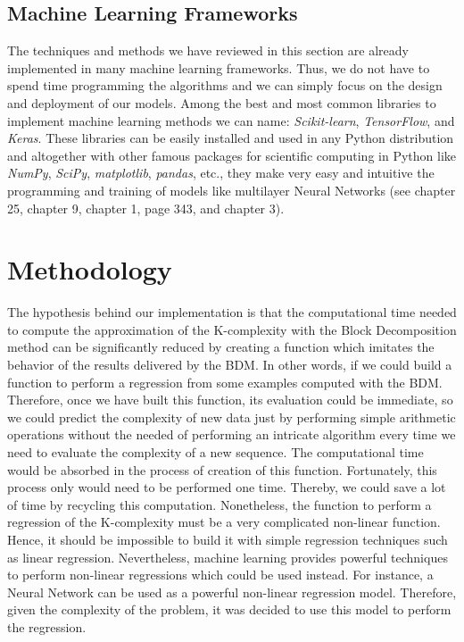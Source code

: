 \subsection{Machine Learning Frameworks}
The techniques and methods we have reviewed in this section are already implemented in many machine learning frameworks. Thus, we do not have to spend time programming the algorithms and we can simply focus on the design and deployment of our models. Among the best and most common libraries to implement machine learning methods we can name: \textit{Scikit-learn}, \textit{TensorFlow}, and \textit{Keras}. These libraries can be easily installed and used in any Python distribution and altogether with other famous packages for scientific computing in Python like \textit{NumPy}, \textit{SciPy}, \textit{matplotlib}, \textit{pandas}, etc., they make very easy and intuitive the programming and training of models like multilayer Neural Networks (see \cite{data_sience} chapter 25, \cite{machine_hands_on} chapter 9, \cite{machine_python} chapter 1, \cite{Python_datsci_Handbook} page 343, and \cite{fudamentals_deep_learning} chapter 3).

\section{Methodology}
The hypothesis behind our implementation is that the computational time needed to compute the approximation of the K-complexity with the Block Decomposition method can be significantly reduced by creating a function which imitates the behavior of the results delivered by the BDM. In other words, if we could build a function to perform a regression from some examples computed with the BDM. Therefore, once we have built this function, its evaluation could be immediate, so we could predict the complexity of new data just by performing simple arithmetic operations without the needed of performing an intricate algorithm every time we need to evaluate the complexity of a new sequence. The computational time would be absorbed in the process of creation of this function. Fortunately, this process only would need to be performed one time. Thereby, we could save a lot of time by recycling this computation. Nonetheless, the function to perform a regression of the K-complexity must be a very complicated non-linear function. Hence, it should be impossible to build it with simple regression techniques such as linear regression. Nevertheless, machine learning provides powerful techniques to perform non-linear regressions which could be used instead.  For instance, a Neural Network can be used as a powerful non-linear regression model. Therefore, given the complexity of the problem, it was decided to use this model to perform the regression.\\

